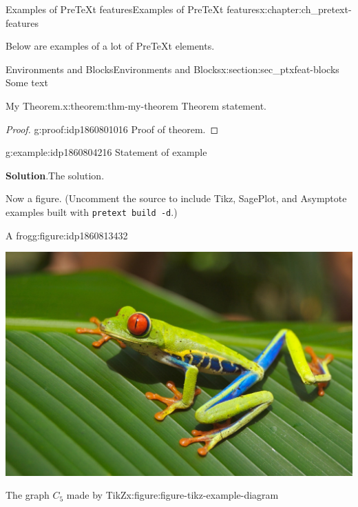 \documentclass[twoside,10pt,]{book}
\newcommand{\blocktitlefont}{\relax}
\newcommand{\mono}[1]{\texttt{#1}}
\numberwithin{equation}{chapter}
\begin{document}
\begin{chapterptx}{Examples of PreTeXt features}{}{Examples of PreTeXt features}{}{}{x:chapter:ch_pretext-features}
\begin{introduction}{}%
Below are examples of a lot of PreTeXt elements.%
\end{introduction}%
%
%
\typeout{************************************************}
\typeout{************************************************}
%
\begin{sectionptx}{Environments and Blocks}{}{Environments and Blocks}{}{}{x:section:sec_ptxfeat-blocks}
Some text%
\begin{theorem}{My Theorem.}{}{x:theorem:thm-my-theorem}%
Theorem statement.%
\end{theorem}
\begin{proof}{}{g:proof:idp1860801016}
Proof of theorem.%
\end{proof}
\begin{example}{}{g:example:idp1860804216}%
Statement of example%
\par\smallskip%
\noindent\textbf{\blocktitlefont Solution}.\hypertarget{g:solution:idp1860806904}{}\quad{}The solution.%
\end{example}
Now a figure. (Uncomment the source to include Tikz, SagePlot, and Asymptote examples built with \mono{pretext build -d}.)%
\begin{figureptx}{A frog}{g:figure:idp1860813432}{}%
\begin{image}{0.25}{0.5}{0.25}%
\includegraphics[width=\linewidth]{external/frog.jpg}
\end{image}%
\tcblower
\end{figureptx}%
\begin{figureptx}{The graph \(C_5\) made by TikZ}{x:figure:figure-tikz-example-diagram}{}%
\begin{image}{0.4}{0.2}{0.4}%
\end{image}
\end{figureptx}
\end{sectionptx}
\end{chapterptx}
\end{document}

